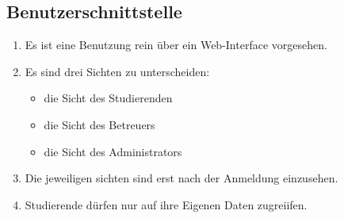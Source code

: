 \documentclass[parskip=full]{scrartcl}
\begin{document}
\subsection{Benutzerschnittstelle}
\begin{enumerate}
  \item Es ist eine Benutzung rein über ein Web-Interface vorgesehen.
  \item Es sind drei Sichten zu unterscheiden:
        \begin{itemize}
          \item die Sicht des Studierenden
          \item die Sicht des Betreuers
          \item die Sicht des Administrators
        \end{itemize}
  \item Die jeweiligen sichten sind erst nach der Anmeldung einzusehen. 
  \item Studierende dürfen nur auf ihre Eigenen Daten zugreiifen.
  
\end{enumerate}
\end{document}
